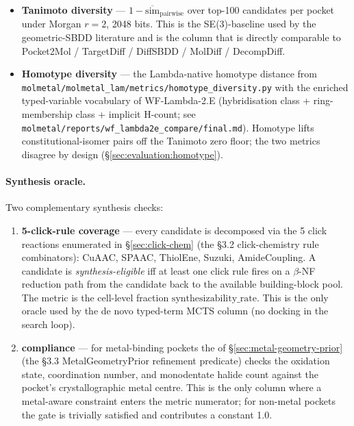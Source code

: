 \begin{itemize}
  \item \textbf{Tanimoto diversity} ---
        $1 - \overline{\mathrm{sim}}_{\mathrm{pairwise}}$ over
        top-100 candidates per pocket under Morgan $r{=}2$, 2048
        bits. This is the SE(3)-baseline used by the geometric-SBDD
        literature and is the column that is directly comparable to
        Pocket2Mol / TargetDiff / DiffSBDD / MolDiff / DecompDiff.
  \item \textbf{Homotype diversity} --- the Lambda-native
        homotype distance from
        \texttt{molmetal/molmetal\_lam/metrics/homotype\_diversity.py}
        \cite{lambda_homotype_metric} with the enriched typed-variable
        vocabulary of WF-Lambda-2.E (hybridisation class +
        ring-membership class + implicit H-count; see
        \texttt{molmetal/reports/wf\_lambda2e\_compare/final.md}).
        Homotype lifts constitutional-isomer pairs off the Tanimoto
        zero floor; the two metrics disagree by design
        (\S\ref{sec:evaluation:homotype}).
\end{itemize}

\paragraph{Synthesis oracle.}
Two complementary synthesis checks:

\begin{enumerate}
  \item \textbf{5-click-rule coverage} --- every candidate is
        decomposed via the 5 click reactions enumerated in
        \S\ref{sec:click-chem} (the §3.2 click-chemistry rule
        combinators): CuAAC, SPAAC, ThiolEne, Suzuki,
        AmideCoupling. A candidate is \emph{synthesis-eligible} iff
        at least one click rule fires on a $\beta$-NF reduction path
        from the candidate back to the available building-block
        pool. The metric is the cell-level fraction
        $\mathrm{synthesizability\_rate}$. This is the only oracle
        used by the de novo typed-term MCTS column (no docking in the search
        loop).
  \item \textbf{\mgp{} compliance} --- for metal-binding pockets the
        \mgp{} of \S\ref{sec:metal-geometry-prior} (the §3.3
        MetalGeometryPrior refinement predicate) checks the
        oxidation state,
        coordination number, and monodentate halide count against
        the pocket's crystallographic metal centre. This is the only
        column where a metal-aware constraint enters the metric
        numerator; for non-metal pockets the \mgp{} gate is
        trivially satisfied and contributes a constant 1.0.
\end{enumerate}

